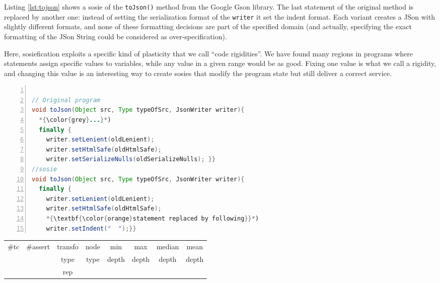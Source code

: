 Listing \ref{lst:tojson} shows a sosie of  the \texttt{toJson()} method from the Google Gson library. 
The last statement of the original method is replaced by another one: instead of setting the serialization format of the \texttt{writer} it set the indent format. 
Each variant creates a JSon with slightly different formats,  and none of these formatting decisions are part of the specified domain (and actually, specifying the exact formatting of the JSon String could be considered as over-specification). 

Here, sosiefication exploits a specific kind of plasticity that we call ``code rigidities''. We have found many regions in programs where statements assign specific values to variables, while any value in a given range would be as good. Fixing one value is what we call a rigidity, and changing this value is an interesting way to create sosies that modify the program state but still deliver a correct service.

\begin{minipage}{\columnwidth}
\begin{lstlisting}[caption={\texttt{toJson} in GSON and a sosie},label={lst:tojson},language=java,numbers=left]

// Original program
void toJson(Object src, Type typeOfSrc, JsonWriter writer){
  *{\color{grey}...}*)
  finally {
    writer.setLenient(oldLenient);
    writer.setHtmlSafe(oldHtmlSafe);
    writer.setSerializeNulls(oldSerializeNulls); }}
//sosie
void toJson(Object src, Type typeOfSrc, JsonWriter writer){
  finally {
    writer.setLenient(oldLenient);
    writer.setHtmlSafe(oldHtmlSafe);
    *{\textbf{\color{orange}statement replaced by following}}*) 
    writer.setIndent("  ");}} 
\end{lstlisting}
\tabcolsep=0.11cm
\begin{tabular}{>{\small}c>{\small}c>{\small}c>{\small}c>{\small}c>{\small}c>{\small}c>{\small}c}
\hline
\rowcolor{lightgray} \#tc & \#assert & transfo & node & min & max & median & mean   \\
\rowcolor{lightgray}  & & type & type & depth  & depth & depth & depth  \\ 
\hline
 &  & rep &  &  &  &  & \\
\hline
\end{tabular}
\end{minipage}
